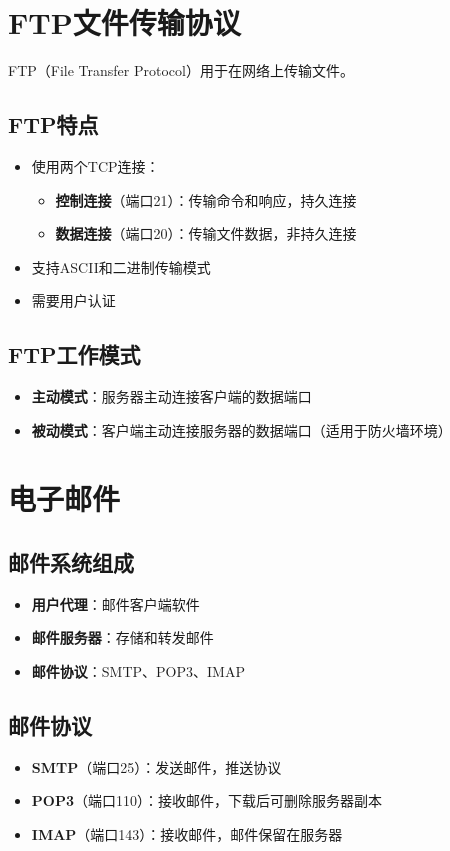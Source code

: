 \section{FTP文件传输协议}
FTP（File Transfer Protocol）用于在网络上传输文件。

\subsection{FTP特点}
\begin{itemize}[leftmargin=2em,itemsep=0pt]
    \item 使用两个TCP连接：
    \begin{itemize}[itemsep=0pt]
        \item \textbf{控制连接}（端口21）：传输命令和响应，持久连接
        \item \textbf{数据连接}（端口20）：传输文件数据，非持久连接
    \end{itemize}
    \item 支持ASCII和二进制传输模式
    \item 需要用户认证
\end{itemize}

\subsection{FTP工作模式}
\begin{itemize}[leftmargin=2em,itemsep=0pt]
    \item \textbf{主动模式}：服务器主动连接客户端的数据端口
    \item \textbf{被动模式}：客户端主动连接服务器的数据端口（适用于防火墙环境）
\end{itemize}

\section{电子邮件}
\subsection{邮件系统组成}
\begin{itemize}[leftmargin=2em,itemsep=0pt]
    \item \textbf{用户代理}：邮件客户端软件
    \item \textbf{邮件服务器}：存储和转发邮件
    \item \textbf{邮件协议}：SMTP、POP3、IMAP
\end{itemize}

\subsection{邮件协议}
\begin{itemize}[leftmargin=2em,itemsep=0pt]
    \item \textbf{SMTP}（端口25）：发送邮件，推送协议
    \item \textbf{POP3}（端口110）：接收邮件，下载后可删除服务器副本
    \item \textbf{IMAP}（端口143）：接收邮件，邮件保留在服务器
\end{itemize}

